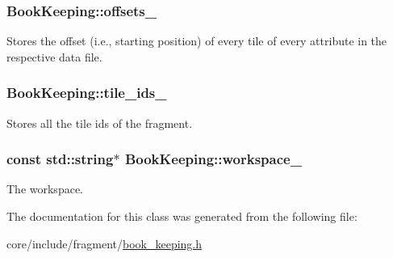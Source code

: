 \subsubsection[{offsets\+\_\+}]{ Book\+Keeping\+::offsets\+\_\+\hspace{0.3cm}{\ttfamily [private]}}\label{classBookKeeping_a7e5a14bb84511e4066f3b387805cb640}
Stores the offset (i.\+e., starting position) of every tile of every attribute in the respective data file. \hypertarget{classBookKeeping_aaccad3c678f7ac3099c9178120ada9d4}{}
\subsubsection[{tile\+\_\+ids\+\_\+}]{ Book\+Keeping\+::tile\+\_\+ids\+\_\+\hspace{0.3cm}{\ttfamily [private]}}\label{classBookKeeping_aaccad3c678f7ac3099c9178120ada9d4}
Stores all the tile ids of the fragment. \hypertarget{classBookKeeping_a87a02b5fe116f6d898da3810e3ab1523}{}
\subsubsection[{workspace\+\_\+}]{\setlength{\rightskip}{0pt plus 5cm}const std\+::string$\ast$ Book\+Keeping\+::workspace\+\_\+\hspace{0.3cm}{\ttfamily [private]}}\label{classBookKeeping_a87a02b5fe116f6d898da3810e3ab1523}
The workspace. 

The documentation for this class was generated from the following file\+:\begin{DoxyCompactItemize}
\item 
core/include/fragment/\hyperlink{book__keeping_8h}{book\+\_\+keeping.\+h}\end{DoxyCompactItemize}
